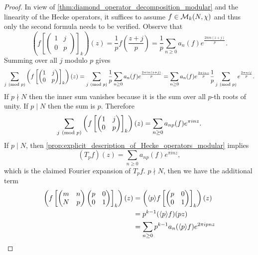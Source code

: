       \begin{proof}
        In view of \cref{thm:diamond_operator_decomposition_modular} and the linearity of the Hecke operators, it suffices to assume $f \in \mathcal{M}_{k}(N,\chi)$ and thus only the second formula needs to be verified. 
        Observe that
        \[
          \left(f\left[\begin{pmatrix} 1 & j \\ 0 & p \end{pmatrix}\right]_{k}\right)(z) = \frac{1}{p}f\left(\frac{z+j}{p}\right) = \frac{1}{p}\sum_{n \ge 0}a_{n}(f)e^{\frac{2\pi in(z+j)}{p}}.
        \]
        Summing over all $j$ modulo $p$ gives
        \[
          \sum_{j \ \left(\text{mod }p\right)}\left(f\left[\begin{pmatrix} 1 & j \\ 0 & p \end{pmatrix}\right]_{k}\right)(z) = \sum_{j \ \left(\text{mod }p\right)}\frac{1}{p}\sum_{n \ge 0}a_{n}(f)e^{\frac{2\pi in(z+j)}{p}} = \sum_{n \ge 0}a_{n}(f)e^{\frac{2\pi inz}{p}}\frac{1}{p}\sum_{j \ \left(\text{mod }p\right)}e^{\frac{2\pi nij}{p}}.
        \]
        If $p \nmid N$ then the inner sum vanishes because it is the sum over all $p$-th roots of unity. If $p \mid N$ then the sum is $p$. Therefore
        \[
          \sum_{j \ \left(\text{mod }p\right)}\left(f\left[\begin{pmatrix} 1 & j \\ 0 & p \end{pmatrix}\right]_{k}\right)(z) = \sum_{n \ge 0}a_{np}(f)e^{\pi inz}.
        \]
        If $p \mid N$, then \cref{prop:explicit_description_of_Hecke_operators_modular} implies
        \[
          (T_{p}f)(z) = \sum_{n \ge 0}a_{np}(f)e^{\pi inz},
        \]
        which is the claimed Fourier expansion of $T_{p}f$. $p \nmid N$, then we have the additional term
        \begin{align*}
          \left(f\left[\begin{pmatrix} m & n \\ N & p \end{pmatrix}\begin{pmatrix} p & 0 \\ 0 & 1 \end{pmatrix}\right]_{k}\right)(z) &= \left(\<p\>f\left[\begin{pmatrix} p & 0 \\ 0 & 1 \end{pmatrix}\right]_{k}\right)(z) \\
          &= p^{k-1}(\<p\>f)(pz) \\
          &= \sum_{n \ge 0}p^{k-1}a_{n}(\<p\>f)e^{2\pi ipnz} \\

\end{align*}
\end{proof}
